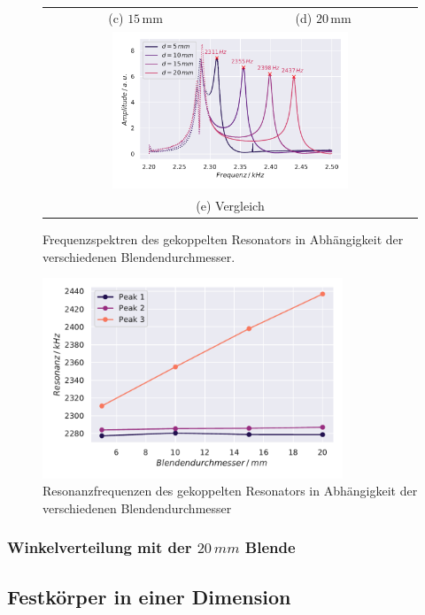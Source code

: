 \begin{figure}[H]
\begin{tabular}{cc}
  (c)  $15 \, \si{\milli\metre}$ & (d)  $20 \, \si{\milli\metre}$ \\[6pt]
  \multicolumn{2}{c}{\includegraphics[width=0.65\textwidth]{Daten/Wasserstoffmolekuelion/blendAbhaeng.pdf}}\\[6pt]
  \multicolumn{2}{c}{(e) Vergleich}
  \end{tabular}
  \caption{Frequenzspektren des gekoppelten Resonators in Abhängigkeit der verschiedenen Blendendurchmesser.} 
  \label{fig:h2}
\end{figure}
\begin{figure}[H]
  \centering
  \includegraphics[width=0.8\textwidth]{Daten/Wasserstoffmolekuelion/resonanzBlend.pdf}
  \caption{Resonanzfrequenzen des gekoppelten Resonators in Abhängigkeit der verschiedenen Blendendurchmesser}
  \label{fig:h2Res}
\end{figure}
\subsubsection{Winkelverteilung mit der $20 \, mm$ Blende}
\subsection{Festkörper in einer Dimension}